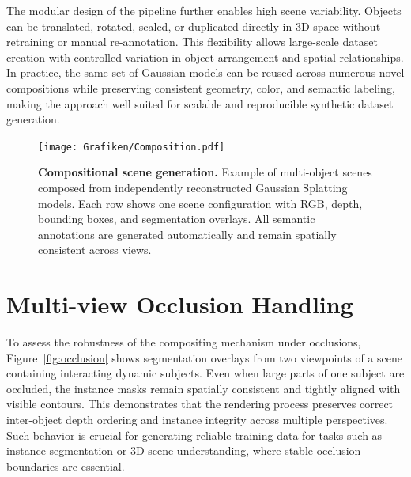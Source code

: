 The modular design of the pipeline further enables high scene variability. 
Objects can be translated, rotated, scaled, or duplicated directly in 3D space without retraining or manual re-annotation. 
This flexibility allows large-scale dataset creation with controlled variation in object arrangement and spatial relationships. 
In practice, the same set of Gaussian models can be reused across numerous novel compositions while preserving consistent geometry, color, and semantic labeling, making the approach well suited for scalable and reproducible synthetic dataset generation.

\begin{figure}[t]
    \centering
    \texttt{[image: Grafiken/Composition.pdf]}
    \caption{
        \textbf{Compositional scene generation.}
        Example of multi-object scenes composed from independently reconstructed Gaussian Splatting models. 
        Each row shows one scene configuration with RGB, depth, bounding boxes, and segmentation overlays.
        All semantic annotations are generated automatically and remain spatially consistent across views.
    }
    \label{fig:composition}
\end{figure}

\section{Multi-view Occlusion Handling}
To assess the robustness of the compositing mechanism under occlusions, 
Figure~\ref{fig:occlusion} shows segmentation overlays from two viewpoints of a scene containing interacting dynamic subjects. 
Even when large parts of one subject are occluded, the instance masks remain spatially consistent and tightly aligned with visible contours. 
This demonstrates that the rendering process preserves correct inter-object depth ordering and instance integrity across multiple perspectives. 
Such behavior is crucial for generating reliable training data for tasks such as instance segmentation or 3D scene understanding, where stable occlusion boundaries are essential.

